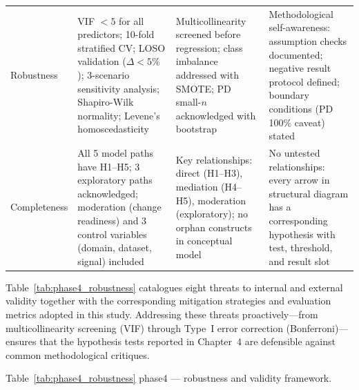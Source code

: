 \begin{xltabular}{\textwidth}{@{} l X X X @{}}
\addlinespace
Robustness             & VIF $< 5$ for all predictors; 10-fold stratified CV; LOSO validation ($\Delta < 5\%$); 3-scenario sensitivity analysis; Shapiro-Wilk normality; Levene's homoscedasticity & Multicollinearity screened before regression; class imbalance addressed with SMOTE; PD small-$n$ acknowledged with bootstrap & Methodological self-awareness: assumption checks documented; negative result protocol defined; boundary conditions (PD 100\% caveat) stated \\
\addlinespace
Completeness           & All 5 model paths have H1--H5; 3 exploratory paths acknowledged; moderation (change readiness) and 3 control variables (domain, dataset, signal) included & Key relationships: direct (H1--H3), mediation (H4--H5), moderation (exploratory); no orphan constructs in conceptual model & No untested relationships: every arrow in structural diagram has a corresponding hypothesis with test, threshold, and result slot \\
\end{xltabular}
\endgroup

\vspace{1.5em}

Table~\ref{tab:phase4_robustness} catalogues eight threats to internal and external validity together with the corresponding mitigation strategies and evaluation metrics adopted in this study. Addressing these threats proactively---from multicollinearity screening (VIF) through Type~I error correction (Bonferroni)---ensures that the hypothesis tests reported in Chapter~4 are defensible against common methodological critiques.

\begingroup\singlespacing\tablefontsize\tablestripes
\noindent Table~\ref{tab:phase4_robustness} phase4 --- robustness and validity framework.

